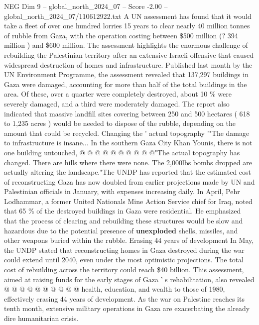 \begin{textsample}{NEG Dim 9 – global\_north\_2024\_07 – Score -2.00 – global\_north\_2024\_07/110612922.txt}  \label{ex:f9_neg_141}
A UN assessment has found that it would take a fleet of over one hundred lorries 15 years to clear nearly 40 million tonnes of rubble from Gaza, with the operation costing between \$500 million (? 394 million ) and \$600 million.
The assessment highlights the enormous challenge of rebuilding the Palestinian territory after an extensive Israeli offensive that caused widespread destruction of homes and infrastructure.
Published last month by the UN Environment Programme, the assessment revealed that 137,297 buildings in Gaza were damaged, accounting for more than half of the total buildings in the area.
Of these, over a quarter were completely destroyed, about 10 \% were severely damaged, and a third were moderately damaged.
The report also indicated that massive landfill sites covering between 250 and 500 hectares ( 618 to 1,235 acres ) would be needed to dispose of the rubble, depending on the amount that could be recycled.
Changing the ' actual topography '"The damage to infrastructure is insane...
In the southern Gaza City Khan Younis, there is not one building untouched, @ @ @ @ @ @ @ @ @ @"The actual topography has changed.
There are hills where there were none.
The 2,000lbs bombs dropped are actually altering the landscape."The UNDP has reported that the estimated cost of reconstructing Gaza has now doubled from earlier projections made by UN and Palestinian officials in January, with expenses increasing daily.
In April, Pehr Lodhammar, a former United Nationals Mine Action Service chief for Iraq, noted that 65 \% of the destroyed buildings in Gaza were residential.
He emphasized that the process of clearing and rebuilding these structures would be slow and hazardous due to the potential presence of \textbf{unexploded} shells, missiles, and other weapons buried within the rubble.
Erasing 44 years of development In May, the UNDP stated that reconstructing homes in Gaza destroyed during the war could extend until 2040, even under the most optimistic projections.
The total cost of rebuilding across the territory could reach \$40 billion.
This assessment, aimed at raising funds for the early stages of Gaza ' s rehabilitation, also revealed @ @ @ @ @ @ @ @ @ @ health, education, and wealth to those of 1980, effectively erasing 44 years of development.
As the war on Palestine reaches its tenth month, extensive military operations in Gaza are exacerbating the already dire humanitarian crisis.

\end{textsample}
